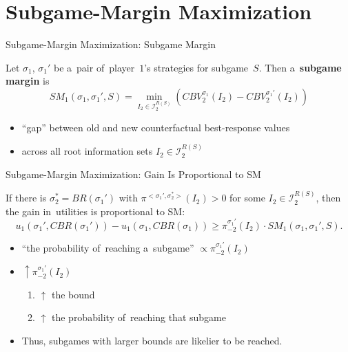 \documentclass{beamer}
\theoremstyle{definition}
\newcommand{\I}{\mathcal{I}}
\begin{document}
  \section{Subgame-Margin Maximization}

  \begin{frame}{Subgame-Margin Maximization: Subgame Margin}
    \pause
    \begin{framed}
      Let $\sigma_1$, $\sigma_1'$ be a~pair of~player~$1$'s strategies for subgame~$S$.
      Then a~\textbf{subgame margin} is
      \[
        SM_1 (\sigma_1, \sigma_1' , S) =
        \min_{I_2 \in \I_2^{R(S)}}
        \left( CBV_2^{\sigma_1} (I_2) - CBV_2^{\sigma_1'} (I_2) \right)
      \]
    \end{framed}
    \pause

    \begin{itemize}[<+- | alert@+>]
      \item ``gap'' between old and new counterfactual best-response values
      \item across all root information sets $I_2 \in \I_2^{R(S)}$
    \end{itemize}
  \end{frame}

  \begin{frame}{Subgame-Margin Maximization: Gain Is Proportional to SM}
    \pause
    \begin{framed}
      \begin{theorem}
        If there is $\sigma_2^* = BR(\sigma_1')$ with $\pi^{<\sigma_1',\sigma_2^*>} (I_2) > 0$ for some $I_2 \in\I_2^{R(S)}$, then the gain in~utilities is proportional to SM:
        \[
          u_1(\sigma_1', CBR(\sigma_1')) - u_1(\sigma_1, CBR(\sigma_1)) \ge \pi_{-2}^{\sigma_1'} (I_2) \cdot SM_1(\sigma_1, \sigma_1', S).
        \]
      \end{theorem}
    \end{framed}
    \pause

    \begin{itemize}[<+- | alert@+>]
       \item ``the probability of~reaching a~subgame'' $\propto \pi_{-2}^{\sigma_1'}(I_2)$
       \item $\uparrow \pi_{-2}^{\sigma_1'}(I_2)$
         \begin{enumerate}[$\Rightarrow$]
           \item $\uparrow$ the bound
           \item $\uparrow$ the probability of~reaching that subgame
         \end{enumerate}
       \item Thus, subgames with larger bounds are likelier to be reached.
    \end{itemize}
  \end{frame}
\end{document}
